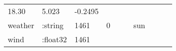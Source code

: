 \documentclass[]{article}
\begin{document}
\begin{longtable}[]{@{}llllllllll@{}}
\begin{minipage}[t]{0.07\columnwidth}
18.30\strut
\end{minipage} & \begin{minipage}[t]{0.12\columnwidth}\raggedright\strut
5.023\strut
\end{minipage} & \begin{minipage}[t]{0.05\columnwidth}\raggedright\strut
-0.2495\strut
\end{minipage}\tabularnewline
\begin{minipage}[t]{0.08\columnwidth}\raggedright\strut
weather\strut
\end{minipage} & \begin{minipage}[t]{0.11\columnwidth}\raggedright\strut
:string\strut
\end{minipage} & \begin{minipage}[t]{0.06\columnwidth}\raggedright\strut
1461\strut
\end{minipage} & \begin{minipage}[t]{0.07\columnwidth}\raggedright\strut
0\strut
\end{minipage} & \begin{minipage}[t]{0.07\columnwidth}\raggedright\strut
\strut
\end{minipage} & \begin{minipage}[t]{0.07\columnwidth}\raggedright\strut
\strut
\end{minipage} & \begin{minipage}[t]{0.04\columnwidth}\raggedright\strut
sun\strut
\end{minipage} & \begin{minipage}[t]{0.07\columnwidth}\raggedright\strut
\strut
\end{minipage} & \begin{minipage}[t]{0.12\columnwidth}\raggedright\strut
\strut
\end{minipage} & \begin{minipage}[t]{0.05\columnwidth}\raggedright\strut
\strut
\end{minipage}\tabularnewline
\begin{minipage}[t]{0.08\columnwidth}\raggedright\strut
wind\strut
\end{minipage} & \begin{minipage}[t]{0.11\columnwidth}\raggedright\strut
:float32\strut
\end{minipage} & \begin{minipage}[t]{0.06\columnwidth}\raggedright\strut
1461\strut
\end{minipage} & \begin{minipage}[t]{0.07\columnwidth}\raggedright\strut

\end{minipage}
\end{longtable}
\end{document}
